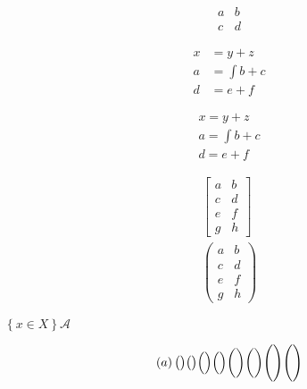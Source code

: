 \documentclass[text,xhtml,itex]{internet}
\begin{document}
\[
  \begin{matrix}
  a & b \\
  c & d
  \end{matrix}
\]

\begin{align}
\label{eq:one}
x &= y + z \\
\label{eq:two}
a &= \int b + c \\
\label{eq:three}
d &= e + f
\end{align}

\begin{gather}
\label{eq:four}
x = y + z \\
\label{eq:five}
a = \int b + c \\
\label{eq:six}
d = e + f
\end{gather}



\begin{align}
  \begin{bmatrix}
  a & b \\
  c & d \\
  e & f \\
  g & h
  \end{bmatrix}
  \\
  \begin{pmatrix}
  a & b \\
  c & d \\
  e & f \\
  g & h
  \end{pmatrix} 
\end{align}

\(\left\{ x \in X\right\} \mathcal{A}\)

\[
\left( a
\right)
\big(
\big)
\bigr(
\bigr)
\Big(
\Big)
\Bigl(
\Bigr)
\bigg(
\bigg)
\biggl(
\biggr)
\Bigg(
\Bigg)
\Biggl(
\Biggr)
\]
\end{document}
